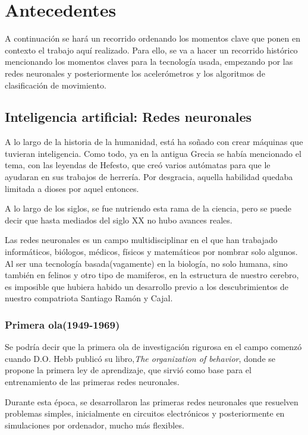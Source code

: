 \documentclass[12pt]{article}
\numberwithin{equation}{section}
\begin{document}
\section{Antecedentes}
A continuación se hará un recorrido ordenando los momentos clave que ponen en contexto el trabajo aquí realizado. Para ello, se va a hacer un recorrido histórico mencionando los momentos claves para la tecnología usada, empezando por las redes neuronales y posteriormente los acelerómetros y los algoritmos de clasificación de movimiento.
\subsection{Inteligencia artificial: Redes neuronales}
A lo largo de la historia de la humanidad, está ha soñado con crear máquinas que tuvieran inteligencia. Como todo, ya en la antigua Grecia se había mencionado el tema, con las leyendas de Hefesto, que creó varios autómatas para que le ayudaran en sus trabajos de herrería. Por  desgracia, aquella habilidad quedaba limitada a dioses por aquel entonces.

A lo largo de los siglos, se fue nutriendo esta rama de la ciencia, pero se puede decir que hasta mediados del siglo XX no hubo avances reales.

Las redes neuronales es un campo multidisciplinar en el que han trabajado informáticos, biólogos, médicos, físicos y matemáticos por nombrar solo algunos. Al ser una tecnología basada(vagamente) en la biología, no solo humana, sino también en felinos y otro tipo de mamiferos, en la estructura de nuestro cerebro, es imposible que hubiera habido un desarrollo previo a los descubrimientos de nuestro compatriota Santiago Ramón y Cajal.

\subsubsection{Primera ola(1949-1969)}

Se podría decir que la primera ola de investigación rigurosa en el campo comenzó cuando D.O. Hebb publicó su libro,\textit{The organization of behavior}, donde se propone la primera ley de aprendizaje, que sirvió como base para el entrenamiento de las primeras redes neuronales.

Durante esta época, se desarrollaron las primeras redes neuronales que resuelven problemas simples, inicialmente en circuitos electrónicos y posteriormente en simulaciones por ordenador, mucho más flexibles.
\end{document}
